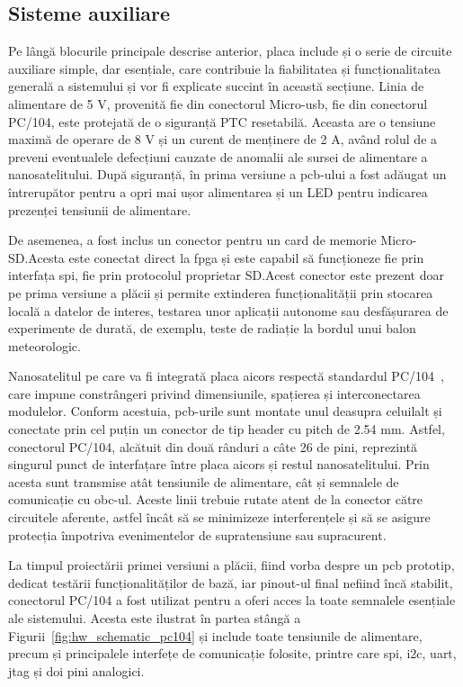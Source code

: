 \documentclass[12pt,a4paper]{report}
\begin{document}
\subsection{Sisteme auxiliare}
 Pe lângă blocurile principale descrise anterior, placa include și o serie de circuite auxiliare simple, dar esențiale, care contribuie la fiabilitatea și funcționalitatea generală a sistemului și vor fi explicate succint în această secțiune. Linia de alimentare de 5 V, provenită fie din conectorul Micro-\gls{usb}, fie din conectorul PC/104, este protejată de o siguranță PTC resetabilă. Aceasta are o tensiune maximă de operare de 8 V și un curent de menținere de 2 A, având rolul de a preveni eventualele defecțiuni cauzate de anomalii ale sursei de alimentare a nanosatelitului. După siguranță, în prima versiune a \gls{pcb}-ului a fost adăugat un întrerupător pentru a opri mai ușor alimentarea și un LED pentru indicarea prezenței tensiunii de alimentare.

De asemenea, a fost inclus un conector pentru un card de memorie Micro-SD.\@ Acesta este conectat direct la \gls{fpga} și este capabil să funcționeze fie prin interfața \gls{spi}, fie prin protocolul proprietar SD.\@ Acest conector este prezent doar pe prima versiune a plăcii și permite extinderea funcționalității prin stocarea locală a datelor de interes, testarea unor aplicații autonome sau desfășurarea de experimente de durată, de exemplu, teste de radiație la bordul unui balon meteorologic.

Nanosatelitul pe care va fi integrată placa \gls{aicors} respectă standardul PC/104~\cite{pc104_spec}, care impune constrângeri privind dimensiunile, spațierea și interconectarea modulelor. Conform acestuia, \gls{pcb}-urile sunt montate unul deasupra celuilalt și conectate prin cel puțin un conector de tip header cu pitch de 2.54 mm. Astfel, conectorul PC/104, alcătuit din două rânduri a câte 26 de pini, reprezintă singurul punct de interfațare între placa \gls{aicors} și restul nanosatelitului. Prin acesta sunt transmise atât tensiunile de alimentare, cât și semnalele de comunicație cu \gls{obc}-ul. Aceste linii trebuie rutate atent de la conector către circuitele aferente, astfel încât să se minimizeze interferențele și să se asigure protecția împotriva evenimentelor de supratensiune sau supracurent.

La timpul proiectării primei versiuni a plăcii, fiind vorba despre un \gls{pcb} prototip, dedicat testării funcționalităților de bază, iar pinout-ul final nefiind încă stabilit, conectorul PC/104 a fost utilizat pentru a oferi acces la toate semnalele esențiale ale sistemului. Acesta este ilustrat în partea stângă a Figurii~\ref{fig:hw_schematic_pc104} și include toate tensiunile de alimentare, precum și principalele interfețe de comunicație folosite, printre care \gls{spi}, \gls{i2c}, \gls{uart}, \gls{jtag} și doi pini analogici.
\end{document}
